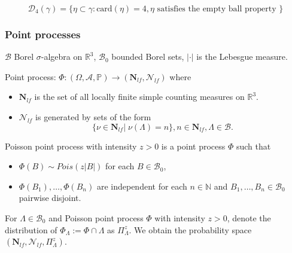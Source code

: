 \documentclass[c, 10pt]{beamer}
\begin{document}
\begin{frame}
$$\mathcal D_4(\gamma) = \{ \eta \subset \gamma: \mathrm{card}(\eta)=4, \eta \text{ satisfies the empty ball property } \}$$




\end{frame}



\begin{frame}\frametitle{Point processes}

	$\mathcal B$ Borel $\sigma$-algebra on $\mathbb R^3$, $\mathcal B_0$ bounded Borel sets, $|\cdot|$ is the Lebesgue measure. \noindent

	\alert{Point process}: $\Phi: (\Omega, \mathcal A, \mathbb P) \to (\mathbf N_{lf}, \mathcal N_{lf})$ where 
\begin{itemize}
	\item $\mathbf N_{lf}$ is the set of all locally finite simple counting measures on $\mathbb R^3$.
	\item $\mathcal N_{lf}$ is generated by sets of the form $$\{\nu \in \mathbf N_{lf} | \; \nu(\Lambda) = n \}, n \in \mathbf N_{lf}, \Lambda \in \mathcal B.$$
\end{itemize}

\pause 
\alert{Poisson point process} with intensity $z>0$ is a point process $\Phi$ such that
\begin{itemize}
    \item $\Phi(B) \sim Pois(z|B|)$ for each $B \in \mathcal B_0$,
    \item $\Phi(B_1), \dots, \Phi(B_n)$ are independent for each $n \in \mathbb N$ and $B_1,\dots, B_n \in \mathcal B_0$ pairwise disjoint.
\end{itemize}

\vspace{5mm} 
\pause
For $\Lambda \in \mathcal B_0$ and Poisson point process $\Phi$ with intensity $z>0$, denote the distribution of $\Phi_\Lambda := \Phi \cap \Lambda$ as \alert{$\Pi_\Lambda^z$}. \newline
We obtain the probability space $(\mathbf N_{lf}, \mathcal N_{lf}, \Pi^z_\Lambda)$.


\end{frame}
\end{document}
